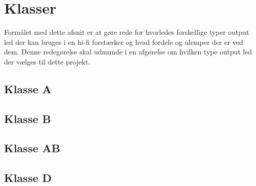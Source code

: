 \chapter{Klasser}
Formålet med dette afsnit er at gøre rede for hvorledes forskellige typer output led der kan bruges i en hi-fi forstærker og hvad fordele og ulemper der er ved dem. Denne redegørelse skal udmunde i en afgørelse om hvilken type output led der vælges til dette projekt.

\section{Klasse A}

\section{Klasse B}

\section{Klasse AB}

\section{Klasse D}